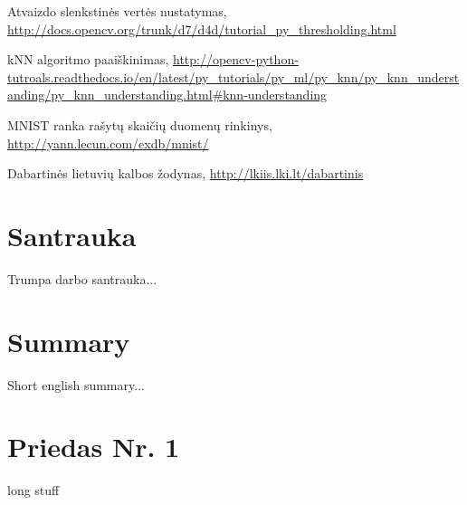 \documentclass[a4paper,12pt]{article}
\begin{document}
\begin{thebibliography}{99}
Atvaizdo slenkstinės vertės nustatymas, \url{http://docs.opencv.org/trunk/d7/d4d/tutorial_py_thresholding.html}

kNN algoritmo paaiškinimas, \url{http://opencv-python-tutroals.readthedocs.io/en/latest/py_tutorials/py_ml/py_knn/py_knn_understanding/py_knn_understanding.html#knn-understanding}

MNIST ranka rašytų skaičių duomenų rinkinys, \url{http://yann.lecun.com/exdb/mnist/}

Dabartinės lietuvių kalbos žodynas, \url{http://lkiis.lki.lt/dabartinis}


\end{thebibliography} 
 
\clearpage 
\section*{Santrauka}
Trumpa darbo santrauka...

\clearpage
\section*{Summary}
Short english summary... 


\clearpage
\appendix
\section*{Priedas Nr. 1}



long stuff
\end{document}
